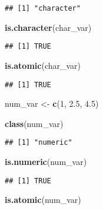 \documentclass[
]{book}
\newenvironment{Shaded}{\begin{snugshade}}{\end{snugshade}}
\newcommand{\DecValTok}[1]{\textcolor[rgb]{0.00,0.00,0.81}{#1}}
\newcommand{\FloatTok}[1]{\textcolor[rgb]{0.00,0.00,0.81}{#1}}
\newcommand{\KeywordTok}[1]{\textcolor[rgb]{0.13,0.29,0.53}{\textbf{#1}}}
\newcommand{\NormalTok}[1]{#1}
\newcommand{\StringTok}[1]{\textcolor[rgb]{0.31,0.60,0.02}{#1}}
\begin{document}
\begin{verbatim}
## [1] "character"
\end{verbatim}

\begin{Shaded}
\begin{Highlighting}[]
\KeywordTok{is.character}\NormalTok{(char\_var)}
\end{Highlighting}
\end{Shaded}

\begin{verbatim}
## [1] TRUE
\end{verbatim}

\begin{Shaded}
\begin{Highlighting}[]
\KeywordTok{is.atomic}\NormalTok{(char\_var)}
\end{Highlighting}
\end{Shaded}

\begin{verbatim}
## [1] TRUE
\end{verbatim}

\begin{Shaded}
\begin{Highlighting}[]
\NormalTok{num\_var \textless{}{-}}\StringTok{ }\KeywordTok{c}\NormalTok{(}\DecValTok{1}\NormalTok{, }\FloatTok{2.5}\NormalTok{, }\FloatTok{4.5}\NormalTok{)}

\KeywordTok{class}\NormalTok{(num\_var)}
\end{Highlighting}
\end{Shaded}

\begin{verbatim}
## [1] "numeric"
\end{verbatim}

\begin{Shaded}
\begin{Highlighting}[]
\KeywordTok{is.numeric}\NormalTok{(num\_var)}
\end{Highlighting}
\end{Shaded}

\begin{verbatim}
## [1] TRUE
\end{verbatim}

\begin{Shaded}
\begin{Highlighting}[]
\KeywordTok{is.atomic}\NormalTok{(num\_var)}
\end{Highlighting}
\end{Shaded}
\end{document}
